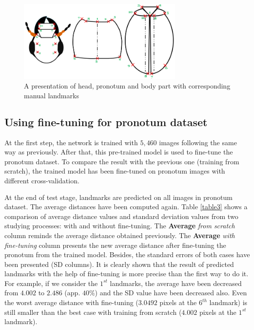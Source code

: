 \documentclass{article} %
\begin{document}
\begin{multicols}{2}
\begin{figure}[H]
        \centering
        \includegraphics[height=1.6in]{images/merge.png}
    \caption{\footnotesize{A presentation of head, pronotum and body part with corresponding manual landmarks}} 
    \label{figshape3parts}
\end{figure}

\subsection{Using fine-tuning for pronotum dataset}
At the first step, the network is trained with $5,460$ images following
the same way as previously. After that, 
this pre-trained model is used to fine-tune the pronotum dataset. To compare the result with the previous one (training from scratch), the trained model has been fine-tuned on pronotum images with different cross-validation. 

At the end of test stage, landmarks are predicted on all images in pronotum dataset. The average distances have been computed again. Table \ref{table3} shows a comparison of average distance values and standard deviation values from two studying processes: with and without fine-tuning. The \textbf{Average} \textit{from scratch} column reminds
the average distance obtained previously. The \textbf{Average} \textit{with fine-tuning}
column presents the new average distance
after fine-tuning the pronotum from the trained model. Besides, the standard errors of both cases have been presented (SD columns). It is
clearly shown that the result of predicted landmarks with the help of
fine-tuning is more precise than the first way to do it. For example, if we consider the $1^{st}$ landmarks, the average have been decreased from \textbf{$4.002$} to \textbf{$2.486$} (app. $40\%$) and the SD value have been decreased also. Even the worst average distance with fine-tuning ($3.0492$ pixels at the $6^{th}$ landmark) is still smaller than the best case with training from scratch ($4.002$ pixels at the $1^{st}$ landmark).


\end{multicols}
\end{document}
